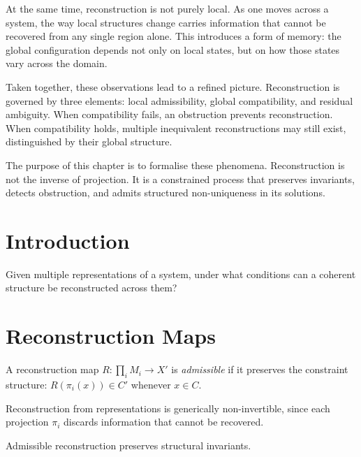 \documentclass[11pt,openany]{book}
\begin{document}
At the same time, reconstruction is not purely local. As one moves across a system, the way local structures change carries information that cannot be recovered from any single region alone. This introduces a form of memory: the global configuration depends not only on local states, but on how those states vary across the domain.

Taken together, these observations lead to a refined picture. Reconstruction is governed by three elements: local admissibility, global compatibility, and residual ambiguity. When compatibility fails, an obstruction prevents reconstruction. When compatibility holds, multiple inequivalent reconstructions may still exist, distinguished by their global structure.

The purpose of this chapter is to formalise these phenomena. Reconstruction is not the inverse of projection. It is a constrained process that preserves invariants, detects obstruction, and admits structured non-uniqueness in its solutions.

\section{Introduction}
\label{sec:introduction-reconstruction}

Given multiple representations of a system, under what
conditions can a coherent structure be reconstructed across
them?

\section{Reconstruction Maps}
\label{sec:reconstruction-maps}

\begin{definition}
\label{def:admissible-reconstruction}
A reconstruction map $R : \prod_{i} M_i \to X'$ is
\emph{admissible} if it preserves the constraint structure:
$R(\pi_i(x)) \in C'$ whenever $x \in C$.
\end{definition}

\begin{proposition}
\label{prop:noninvertibility-reconstruction}
Reconstruction from representations is generically
non-invertible, since each projection $\pi_i$ discards
information that cannot be recovered.
\end{proposition}

\begin{proposition}
\label{prop:invariant-preservation}
Admissible reconstruction preserves structural invariants.
\end{proposition}
\end{document}

